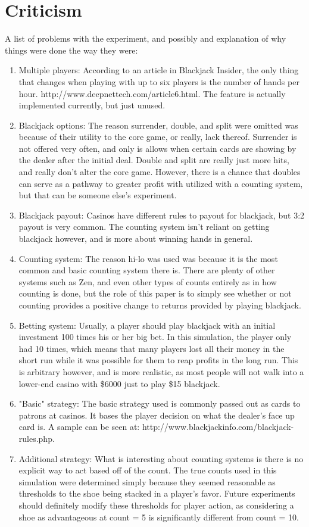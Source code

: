 \documentclass[11pt,letterpaper]{article}
\begin{document}
\part{Criticism}
A list of problems with the experiment, and possibly and explanation of why things were done the way they were:
\begin{enumerate}
\item Multiple players: According to an article in Blackjack Insider, the only thing that changes when playing with up to six players is the number of hands per hour. http://www.deepnettech.com/article6.html. The feature is actually implemented currently, but just unused.
\item Blackjack options: The reason surrender, double, and split were omitted was because of their utility to the core game, or really, lack thereof. Surrender is not offered very often, and only is allows when certain cards are showing by the dealer after the initial deal. Double and split are really just more hits, and really don't alter the core game. However, there is a chance that doubles can serve as a pathway to greater profit with utilized with a counting system, but that can be someone else's experiment.
\item Blackjack payout: Casinos have different rules to payout for blackjack, but 3:2 payout is very common. The counting system isn't reliant on getting blackjack however, and is more about winning hands in general.
\item Counting system: The reason hi-lo was used was because it is the most common and basic counting system there is. There are plenty of other systems such as Zen, and even other types of counts entirely as in how counting is done, but the role of this paper is to simply see whether or not counting provides a positive change to returns provided by playing blackjack.
\item Betting system: Usually, a player should play blackjack with an initial investment 100 times his or her big bet. In this simulation, the player only had 10 times, which means that many players lost all their money in the short run while it was possible for them to reap profits in the long run. This is arbitrary however, and is more realistic, as most people will not walk into a lower-end casino with \$6000 just to play \$15 blackjack. 
\item "Basic" strategy: The basic strategy used is commonly passed out as cards to patrons at casinos. It bases the player decision on what the dealer's face up card is. A sample can be seen at: http://www.blackjackinfo.com/blackjack-rules.php.
\item Additional strategy: What is interesting about counting systems is there is no explicit way to act based off of the count. The true counts used in this simulation were determined simply because they seemed reasonable as thresholds to the shoe being stacked in a player's favor. Future experiments should definitely modify these thresholds for player action, as considering a shoe as advantageous at count = 5 is significantly different from count = 10.
\end{enumerate}
\end{document}
